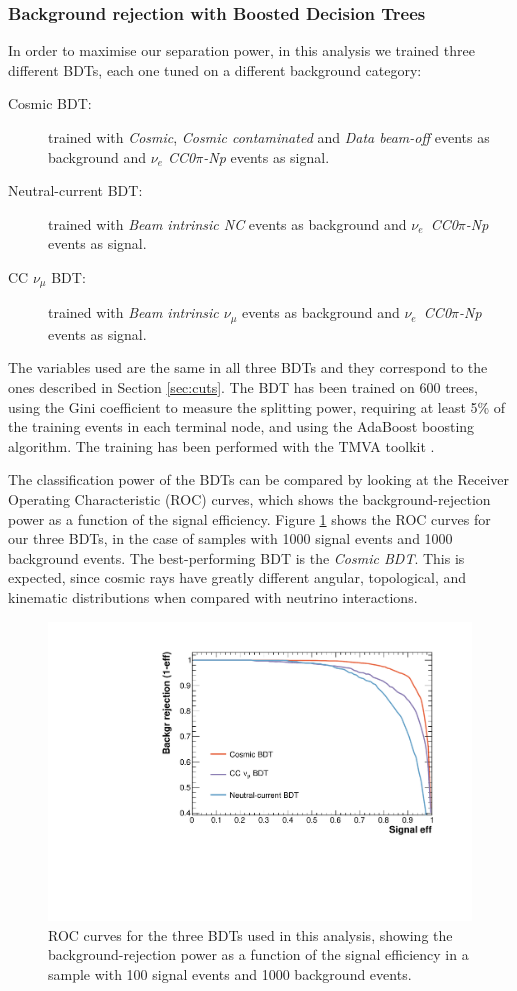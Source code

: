 \subsubsection{Background rejection with Boosted Decision Trees}
In order to maximise our separation power, in this analysis we trained three different BDTs, each one tuned on a different background category:
\begin{description}
\item[Cosmic BDT:] trained with \emph{Cosmic}, \emph{Cosmic contaminated} and \emph{Data beam-off} events as background and \emph{$\nu_e$ CC0$\pi$-Np} events as signal. 
\item[Neutral-current BDT:] trained with \emph{Beam intrinsic NC} events as background and \emph{$\nu_e$~CC0$\pi$-Np} events as signal. 
\item[CC $\nu_{\mu}$ BDT:] trained with \emph{Beam intrinsic $\nu_{\mu}$} events as background and \emph{$\nu_e$~CC0$\pi$-Np} events as signal. 
\end{description}

The variables used are the same in all three BDTs and they correspond to the ones described in Section \ref{sec:cuts}. The BDT has been trained on 600 trees, using the Gini coefficient to measure the splitting power, requiring at least 5\% of the training events in each terminal node, and using the AdaBoost boosting algorithm. The training has been performed with the TMVA toolkit \cite{Hocker:2007ht}. 

The classification power of the BDTs can be compared by looking at the Receiver Operating Characteristic (ROC) curves, which shows the background-rejection power as a function of the signal efficiency. Figure \ref{fig:roc} shows the ROC curves for our three BDTs, in the case of samples with 1000 signal events and 1000 background events. The best-performing BDT is the \emph{Cosmic BDT}. This is expected, since cosmic rays have greatly different angular, topological, and kinematic distributions when compared with neutrino interactions. 

\begin{figure}[htbp]
\centering
  \includegraphics[width=0.75\linewidth]{figures/roc.pdf}
  \caption{ROC curves for the three BDTs used in this analysis, showing the background-rejection power as a function of the signal efficiency in a sample with 100 signal events and 1000 background events.}\label{fig:roc}
\end{figure}


